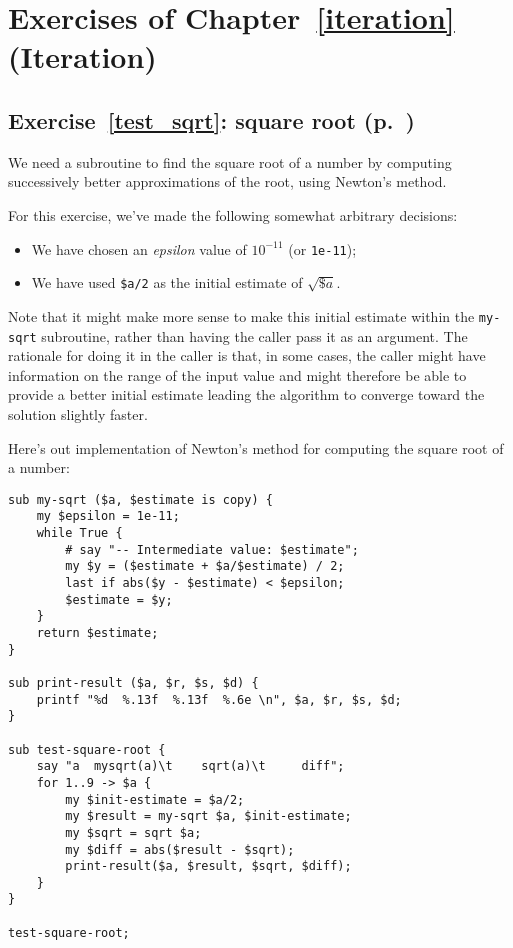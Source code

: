 \section{Exercises of Chapter~\ref{iteration} (Iteration)}

\subsection{Exercise~\ref{test_sqrt}: square root (p.~\pageref{test_sqrt})}
\label{sol_test_sqrt}

We need a subroutine to find the square root of a number by 
computing successively better approximations of the root, using 
Newton's method.

For this exercise, we've made the following somewhat 
arbitrary decisions:
\begin{itemize}
\item We have chosen an \emph{epsilon} value of $10^{-11}$ (or {\tt 1e-11});
\item We have used \verb'$a/2' as the initial estimate 
of $\sqrt{\$a}$. 
\end{itemize}

Note that it might make more sense to make this 
initial estimate within the {\tt my-sqrt} subroutine, 
rather than having the caller pass it as an argument. The 
rationale for doing it in the caller is that, in some cases, 
the caller might have information on the range of the input 
value and might therefore be able to provide a better 
initial estimate leading the algorithm to converge toward 
the solution slightly faster.

Here's out implementation of Newton's method for computing 
the square root of a number:

\begin{verbatim}
sub my-sqrt ($a, $estimate is copy) {
    my $epsilon = 1e-11;
    while True {
        # say "-- Intermediate value: $estimate";
        my $y = ($estimate + $a/$estimate) / 2;
        last if abs($y - $estimate) < $epsilon;
        $estimate = $y;
    }
    return $estimate;
}

sub print-result ($a, $r, $s, $d) {
    printf "%d  %.13f  %.13f  %.6e \n", $a, $r, $s, $d;
}

sub test-square-root {
    say "a  mysqrt(a)\t    sqrt(a)\t     diff";
    for 1..9 -> $a {
        my $init-estimate = $a/2;
        my $result = my-sqrt $a, $init-estimate;
        my $sqrt = sqrt $a;
        my $diff = abs($result - $sqrt);
        print-result($a, $result, $sqrt, $diff);
    }
}
    
test-square-root;
\end{verbatim}

